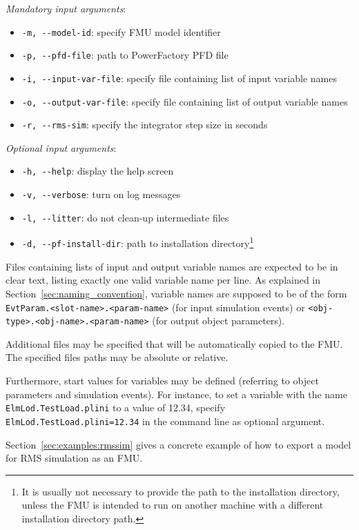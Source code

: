 \textit{Mandatory input arguments}:
\begin{itemize}
  \item \verb!-m, --model-id!: specify FMU model identifier
  \item \verb!-p, --pfd-file!: path to PowerFactory PFD file
  \item \verb!-i, --input-var-file!: specify file containing list of input variable names
  \item \verb!-o, --output-var-file!: specify file containing list of output variable names
  \item \verb!-r, --rms-sim!: specify the integrator step size in seconds
\end{itemize}
\textit{Optional input arguments}:
\begin{itemize}
  \item \verb!-h, --help!: display the help screen
  \item \verb!-v, --verbose!: turn on log messages
  \item \verb!-l, --litter!: do not clean-up intermediate files
  \item \verb!-d, --pf-install-dir!: path to \pf installation directory\footnote{It is usually not necessary to provide the path to the \pf installation directory, unless the FMU is intended to run on another machine with a different installation directory path.}
\end{itemize}
Files containing lists of input and output variable names are expected to be in clear text, listing exactly one valid variable name per line.
As explained in Section~\ref{sec:naming_convention}, variable names are supposed to be of the form \texttt{EvtParam.<slot-name>.<param-name>} (for input simulation events) or \texttt{<obj-type>.<obj-name>.<param-name>} (for output object parameters).

Additional files may be specified that will be automatically copied to the FMU. The specified files paths may be absolute or relative.

Furthermore, start values for variables may be defined (referring to object parameters and simulation events). For instance, to set a variable with the name \texttt{ElmLod.TestLoad.plini} to a value of 12.34, specify \texttt{ElmLod.TestLoad.plini=12.34} in the command line as optional argument.

Section~\ref{sec:examples:rmssim} gives a concrete example of how to export a model for RMS simulation as an FMU.


